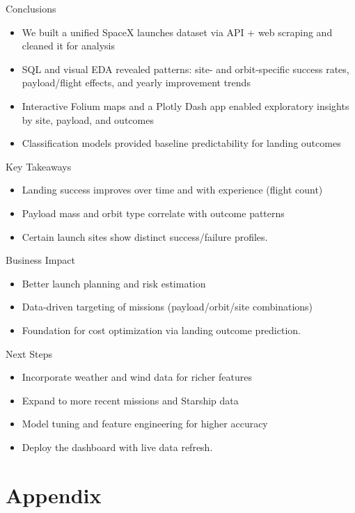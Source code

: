 \begin{frame}[allowframebreaks]{Conclusions}
    \begin{itemize}
        \item We built a unified SpaceX launches dataset via API + web scraping and cleaned it for analysis
        \item SQL and visual EDA revealed patterns: site- and orbit-specific success rates, payload/flight effects, and yearly improvement trends
        \item Interactive Folium maps and a Plotly Dash app enabled exploratory insights by site, payload, and outcomes
        \item Classification models provided baseline predictability for landing outcomes
    \end{itemize}
    \large Key Takeaways
    \begin{itemize}
        \item Landing success improves over time and with experience (flight count)
        \item Payload mass and orbit type correlate with outcome patterns
        \item Certain launch sites show distinct success/failure profiles.
    \end{itemize}
    \framebreak
    \large Business Impact
    \begin{itemize}
        \item Better launch planning and risk estimation
        \item Data-driven targeting of missions (payload/orbit/site combinations)
        \item Foundation for cost optimization via landing outcome prediction.
    \end{itemize}
    \large Next Steps
    \begin{itemize}
        \item Incorporate weather and wind data for richer features
        \item Expand to more recent missions and Starship data
        \item Model tuning and feature engineering for higher accuracy
        \item Deploy the dashboard with live data refresh.
    \end{itemize}
\end{frame}

\section{Appendix}

